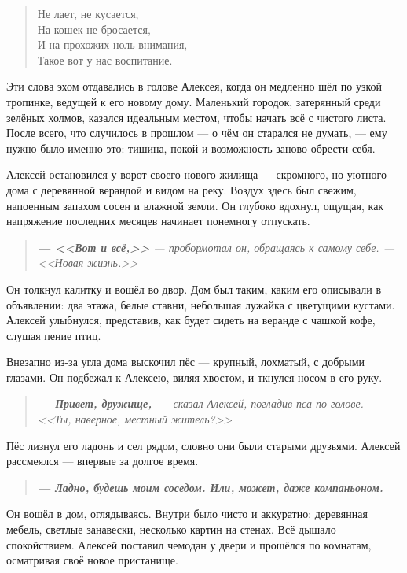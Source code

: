 \documentclass[12pt,a4paper]{book}
\newenvironment{dialogue}{\begin{quote}\itshape}{\end{quote}}
\begin{document}
\begin{verse}
Не лает, не кусается,\\
На кошек не бросается,\\
И на прохожих ноль внимания,\\
Такое вот у нас воспитание.
\end{verse}

Эти слова эхом отдавались в голове Алексея, когда он медленно шёл по узкой тропинке, ведущей к его новому дому. Маленький городок, затерянный среди зелёных холмов, казался идеальным местом, чтобы начать всё с чистого листа. После всего, что случилось в прошлом --- о чём он старался не думать, --- ему нужно было именно это: тишина, покой и возможность заново обрести себя.

Алексей остановился у ворот своего нового жилища --- скромного, но уютного дома с деревянной верандой и видом на реку. Воздух здесь был свежим, напоенным запахом сосен и влажной земли. Он глубоко вдохнул, ощущая, как напряжение последних месяцев начинает понемногу отпускать.

\begin{dialogue}
\textbf{--- <<Вот и всё,>>} --- пробормотал он, обращаясь к самому себе. --- <<Новая жизнь.>>
\end{dialogue}

Он толкнул калитку и вошёл во двор. Дом был таким, каким его описывали в объявлении: два этажа, белые ставни, небольшая лужайка с цветущими кустами. Алексей улыбнулся, представив, как будет сидеть на веранде с чашкой кофе, слушая пение птиц.

Внезапно из-за угла дома выскочил пёс --- крупный, лохматый, с добрыми глазами. Он подбежал к Алексею, виляя хвостом, и ткнулся носом в его руку.

\begin{dialogue}
\textbf{--- Привет, дружище, ---} сказал Алексей, погладив пса по голове. --- <<Ты, наверное, местный житель?>>
\end{dialogue}

Пёс лизнул его ладонь и сел рядом, словно они были старыми друзьями. Алексей рассмеялся --- впервые за долгое время.

\begin{dialogue}
\textbf{--- Ладно, будешь моим соседом. Или, может, даже компаньоном.}
\end{dialogue}

Он вошёл в дом, оглядываясь. Внутри было чисто и аккуратно: деревянная мебель, светлые занавески, несколько картин на стенах. Всё дышало спокойствием. Алексей поставил чемодан у двери и прошёлся по комнатам, осматривая своё новое пристанище.
\end{document}
